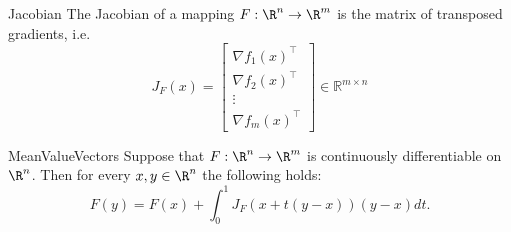 \newpage

\begin{theo}[Jacobian]{Jacobian}
    The Jacobian of a mapping $F: \R^n \to \R^m$ is the matrix of transposed gradients, i\@.e\@.
    \begin{equation*}
        J_F(x) = \begin{bmatrix}
            \nabla f_1(x)^\top \\
            \nabla f_2(x)^\top \\
            \vdots \\
            \nabla f_m(x)^\top
            \end{bmatrix}
            \in \mathbb{R}^{m \times n}
    \end{equation*}
    \vspace*{-0.4cm}
\end{theo}


\begin{app}{MeanValueVectors}
    Suppose that $F: \R^n \to \R^m$ is continuously differentiable on $\R^n$. Then for every $x,y \in \R^n$ the following holds: 
    \begin{equation*}
        F(y) = F(x) + \int_0^1 J_F(x + t(y - x)) (y - x) dt.
    \end{equation*}
    \vspace{-0.3cm}
\end{app}

